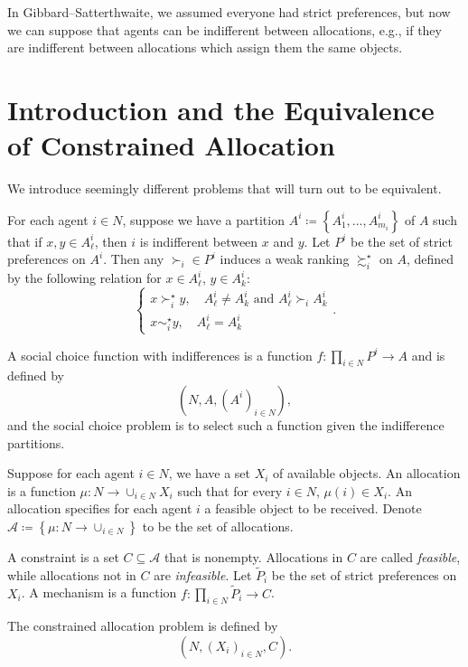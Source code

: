 
In Gibbard--Satterthwaite, we assumed everyone had strict preferences, but now we can suppose that agents can be indifferent between allocations, e.g., if they are indifferent between allocations which assign them the same objects.

\section{Introduction and the Equivalence of Constrained Allocation}

We introduce seemingly different problems that will turn out to be equivalent.

\begin{definition}
	For each agent $i\in N$, suppose we have a partition $A^i \coloneqq \left\{A_1^i, \ldots,A_{m_i}^{i}\right\}$ of $A$ such that if $x,y \in A_\ell^{i}$, then $i$ is indifferent between $x$ and $y$.
	Let $P^i$ be the set of strict preferences on $A^i$.
	Then any $\succ_i \in P^i$ induces a weak ranking $\succsim_i^\star$ on $A$, defined by the following relation for $x \in A_\ell^i$, $y \in A_k^{i}$: \[
		\begin{cases}
			x \succ_i^\star y, \quad A_\ell^{i} \ne A_k^{i} \text{ and } A_\ell^{i} \succ_i A_k^{i} \\
			x \sim_i^\star y, \quad A_\ell^{i}=A_{k}^{i}
		\end{cases}
	.\] 

	A social choice function with indifferences is a function $f: \prod_{i \in N}^{} P^i \to A$ and is defined by \[
		\left( N, A, \left( A^i \right)_{i \in N} \right)
	,\] 
	and the social choice problem is to select such a function given the indifference partitions.
\end{definition}

\begin{definition}
	Suppose for each agent $i \in N$, we have a set $X_i$ of available objects. 
	An allocation is a function $\mu: N \to \cup_{i \in N} X_i$ such that for every $i \in N$, $\mu(i) \in X_i$. An allocation specifies for each agent $i$ a feasible object to be received.
	Denote $\mathscr{A} \coloneqq \left\{\mu: N \to \cup_{i \in N}\right\}$ to be the set of allocations.

	A constraint is a set $C \subseteq \mathscr{A}$ that is nonempty. Allocations in $C$ are called \emph{feasible}, while allocations not in $C$ are \emph{infeasible}.
	Let $\tilde{P}_i$ be the set of strict preferences on $X_i$. A mechanism is a function $f: \prod_{i \in N}^{} \tilde{P}_i \to C$.

	The constrained allocation problem is defined by \[
		\left( N, \left( X_i \right)_{i \in N}, C \right)
	.\] 
\end{definition}

